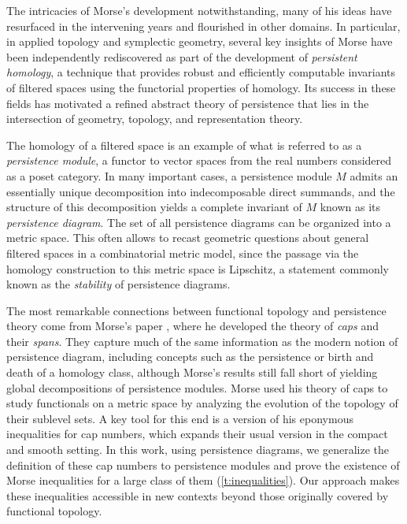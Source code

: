 The intricacies of Morse's development notwithstanding, many of his ideas have resurfaced in the intervening years and flourished in other domains.
In particular, in applied topology and symplectic geometry, several key insights of Morse have been independently rediscovered as part of the development of \emph{persistent homology}, a technique that provides robust and efficiently computable invariants of filtered spaces using the functorial properties of homology.
Its success in these fields has motivated a refined abstract theory of persistence that lies in the intersection of geometry, topology, and representation theory.

The homology of a filtered space is an example of what is referred to as a \emph{persistence module}, a functor to vector spaces from the real numbers considered as a poset category.
In many important cases, a persistence module $M$ admits an essentially unique decomposition into indecomposable direct summands, and the structure of this decomposition yields a complete invariant of $M$ known as its \emph{persistence diagram}.
The set of all persistence diagrams can be organized into a metric space.
This often allows to recast geometric questions about general filtered spaces in a combinatorial metric model, since the passage via the homology construction to this metric space is Lipschitz, a statement commonly known as the \emph{stability} of persistence diagrams.

The most remarkable connections between functional topology and persistence theory come from Morse's paper \cite{Morse.1940}, where he developed the theory of \emph{caps} and their \emph{spans}.
They capture much of the same information as the modern notion of persistence diagram, including concepts such as the persistence or birth and death of a homology class, although Morse's results still fall short of yielding global decompositions of persistence modules.
Morse used his theory of caps to study functionals on a metric space by analyzing the evolution of the topology of their sublevel sets.
A key tool for this end is a version of his eponymous inequalities for cap numbers, which expands their usual version in the compact and smooth setting.
In this work, using persistence diagrams, we generalize the definition of these cap numbers to persistence modules and prove the existence of Morse inequalities for a large class of them (\cref{t:inequalities}).
Our approach makes these inequalities accessible in new contexts beyond those originally covered by functional topology. %

